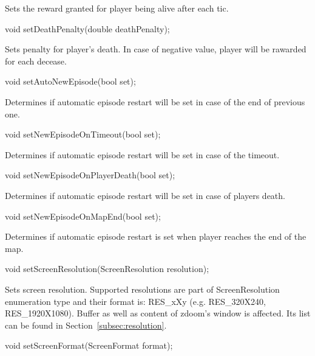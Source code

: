 Sets the reward granted for player being alive after each tic.


\vspace{20pt}
\begin{clinee}
void setDeathPenalty(double deathPenalty);
\end{clinee}

Sets penalty for player's death. In case of negative value, player will be rawarded for each decease.


\vspace{20pt}
\begin{clinee}
void setAutoNewEpisode(bool set);
\end{clinee}

Determines if automatic episode restart will be set in case of the end of previous one.


\vspace{20pt}
\begin{clinee}
void setNewEpisodeOnTimeout(bool set);
\end{clinee}

Determines if automatic episode restart will be set in case of the timeout.


\vspace{20pt}
\begin{clinee}
void setNewEpisodeOnPlayerDeath(bool set);
\end{clinee}

Determines if automatic episode restart will be set in case of players death.


\vspace{20pt}
\begin{clinee}
void setNewEpisodeOnMapEnd(bool set);
\end{clinee}

Determines if automatic episode restart is set when player reaches the end of the map.


\vspace{20pt}
\begin{clinee}
void setScreenResolution(ScreenResolution resolution);
\end{clinee}

Sets screen resolution. Supported resolutions are part of ScreenResolution enumeration type and their format is: RES\_xXy (e.g. RES\_320X240, RES\_1920X1080). Buffer as well as content of zdoom's window is affected. Its list can be found in Section~\ref{subsec:resolution}.


\vspace{20pt}
\begin{clinee}
 void setScreenFormat(ScreenFormat format);
\end{clinee}

